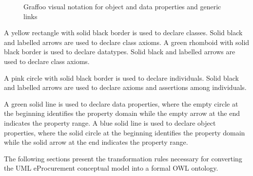 	\begin{figure}[!b]
		\centering
		\caption{Graffoo visual notation for object and data properties and generic links}
		\label{fig:graffoo-predicates}
	\end{figure}
	
	A yellow rectangle with solid black border is used to declare classes. Solid black and labelled arrows are used to declare class axioms. A green rhomboid with solid black border is used to declare datatypes. Solid black and labelled arrows are used to declare class axioms.
	
	A pink circle with solid black border is used to declare individuals. Solid black and labelled arrows are used to declare axioms and assertions among individuals.

	A green solid line is used to declare data properties, where the empty circle at the beginning identifies the property domain while the empty arrow at the end indicates the property range. A blue solid line is used to declare object properties, where the solid circle at the beginning identifies the property domain while the solid arrow at the end indicates the property range.			
		

	The following sections present the transformation rules necessary for converting the UML eProcurement conceptual model into a formal OWL ontology. 